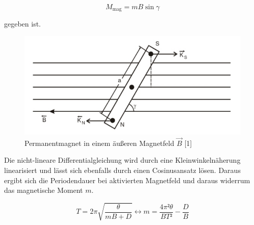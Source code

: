 \begin{equation}
M_\text{mag} = m B \sin{\gamma}
\end{equation}

gegeben ist. 

\begin{figure}
  \centering
  \includegraphics[scale=0.3]{content/Magnet.png}
  \caption{Permanentmagnet in einem äußeren Magnetfeld $\vec{B}$ [1]}
  \label{fig:Magnet}
\end{figure}

Die nicht-lineare Differentialgleichung wird durch eine Kleinwinkelnäherung linearisiert
und lässt sich ebenfalls durch einen Cosinusansatz lösen. Daraus ergibt sich die Periodendauer
bei aktivierten Magnetfeld und daraus widerrum das magnetische Moment $m$.

\begin{equation}
T = 2\pi \sqrt{\frac{\theta}{mB+D}} \leftrightarrow m = \frac{4\pi²\theta}{BT²}-\frac{D}{B}
\end{equation}